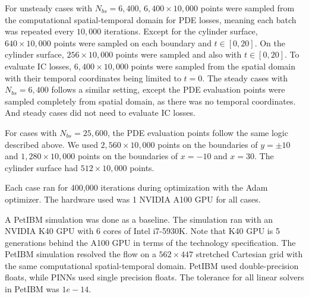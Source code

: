 For unsteady cases with $N_{bs}=6,400$, $6,400\times 10,000$ points were sampled from the computational spatial-temporal domain for PDE losses, meaning each batch was repeated every $10,000$ iterations.
Except for the cylinder surface, $640\times 10,000$ points were sampled on each boundary and $t\in[0, 20]$.
On the cylinder surface, $256\times 10,000$ points were sampled and also with $t\in[0, 20]$.
To evaluate IC losses, $6,400\times 10,000$ points were sampled from the spatial domain with their temporal coordinates being limited to $t=0$.
The steady cases with $N_{bs}=6,400$ follows a similar setting, except the PDE evaluation points were sampled completely from spatial domain, as there was no temporal coordinates.
And steady cases did not need to evaluate IC losses.

For cases with $N_{bs}=25,600$, the PDE evaluation points follow the same logic described above.
We used $2,560\times 10,000$ points on the boundaries of $y=\pm 10$ and $1,280\times 10,000$ points on the boundaries of $x=-10$ and $x=30$.
The cylinder surface had $512\times 10,000$ points.

Each case ran for 400,000 iterations during optimization with the Adam optimizer.
The hardware used was 1 NVIDIA A100 GPU for all cases.

A PetIBM simulation was done as a baseline.
The simulation ran with an NVIDIA K40 GPU with 6 cores of Intel i7-5930K.
Note that K40 GPU is 5 generations behind the A100 GPU in terms of the technology specification.
The PetIBM simulation resolved the flow on a $562 \times 447$ stretched Cartesian grid with the same computational spatial-temporal domain.
PetIBM used double-precision floats, while PINNs used single precision floats.
The tolerance for all linear solvers in PetIBM was $1e-14$.
